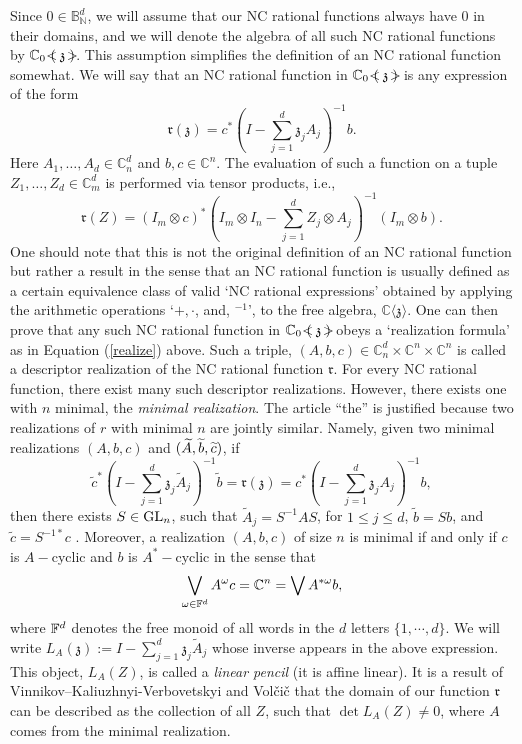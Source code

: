 \documentclass{article}
\theoremstyle{definition}
\theoremstyle{remark}
\numberwithin{equation}{section}
\newcommand{\be}{\begin{equation}}
\newcommand{\ee}{\end{equation}}
\newcommand{\mf}{\ensuremath{\mathfrak}}
\newcommand{\wt}{\ensuremath{\widetilde}}
\newcommand{\om}{\ensuremath{\omega}}
\def\C{\mathbb{C}}
\def\N{\mathbb{N}}
\def\B{\mathbb{B}}
\def\fr{\mathfrak{r}}
\def\fp{\mathbb{C} \langle \mathbb{\mathfrak{z}} \rangle }
\def\ratfps{\C _0 \ \mathclap{\, <}{\left( \right.} \,  \mf{z} \, \mathclap{ \, \, \, \, >}{\left. \right)} }
\begin{document}
Since $0 \in \B ^d _\N$, we will assume that our NC rational functions always have $0$ in their domains, and we will denote the algebra of all such NC rational functions by $\ratfps$.  This assumption simplifies the definition of an NC rational function somewhat. We will say that an NC rational function in $\ratfps$ is any expression of the form
\[
\fr(\mathfrak{z}) = c^* \left(I - \sum_{j=1}^d \mathfrak{z}_j A_j\right)^{-1} b.
\]
Here $A_1,\ldots,A_d \in \C ^d _n$ and $b,c \in \C^n$. The evaluation of such a function on a tuple $Z_1,\ldots, Z_d \in \C ^d _m$ is performed via tensor products, i.e.,
\be
\fr(Z) = (I_m \otimes c)^* \left(I_m \otimes I_n - \sum_{j=1}^d Z_j \otimes A_j\right)^{-1} (I_m \otimes b). \label{realize}
\ee
One should note that this is not the original definition of an NC rational function but rather a result in the sense that an NC rational function is usually defined as a certain equivalence class of valid `NC rational expressions' obtained by applying the arithmetic operations `$+, \cdot$, and, $^{-1}$', to the free algebra, $\fp$.  One can then prove that any such NC rational function in $\ratfps$ obeys a `realization formula' as in Equation (\ref{realize}) above. Such a triple, $(A,b,c) \in \C ^d _n \times \C ^n \times \C ^n$ is called a descriptor realization of the NC rational function $\fr$. For every NC rational function, there exist many such descriptor realizations. However, there exists one with $n$ minimal, the \emph{minimal realization}. The article ``the'' is justified because two realizations of $r$ with minimal $n$ are jointly similar. Namely, given two minimal realizations $(A,b,c)$ and $(\wt{A}, \wt{b}, \wt{c})$, if
\[
\tilde{c}^* \left(I - \sum_{j=1}^d \mathfrak{z}_j \tilde{A}_j\right)^{-1} \tilde{b} = \fr(\mathfrak{z}) = c^* \left(I - \sum_{j=1}^d \mathfrak{z}_j A_j\right)^{-1} b,
\]
then there exists $S \in \mathrm{GL}_n$, such that $\tilde{A}_j = S^{-1} A S$, for $1 \leq j \leq d$, $\tilde{b} = S b$, and $\tilde{c} = S^{-1 *} c$ \cite[Theorem 2.4]{BR}. Moreover, a realization $(A,b,c)$ of size $n$ is minimal if and only if $c$ is $A-$cyclic and $b$ is $A^*-$cyclic in the sense that 
$$ \bigvee _{\om \in \F ^d} A^\om c = \C ^n = \bigvee A^{*\om} b, $$ where ${\mathbb F} ^d$ denotes the free monoid of all words in the $d$ letters $\{ 1 , \cdots , d \}$. We will write $L_A(\mathfrak{z}) := I - \sum_{j=1}^d \mathfrak{z}_j \tilde{A}_j$ whose inverse appears in the above expression. This object, $L_A (Z)$, is called a \emph{linear pencil} (it is affine linear). It is a result of Vinnikov--Kaliuzhnyi-Verbovetskyi \cite{KVV-ncrat} and Vol\v{c}i\v{c} \cite{Volcic} that the domain of our function $\fr$ can be described as the collection of all $Z$, such that $\det L_A(Z) \neq 0$, where $A$ comes from the minimal realization.
\end{document}
